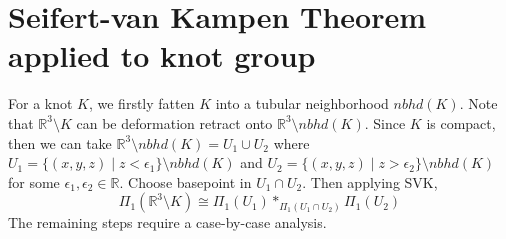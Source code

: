 \section{Seifert-van Kampen Theorem applied to knot group}

For a knot $K$, we firstly fatten $K$ into a tubular neighborhood $nbhd(K)$. Note that $\mathbb{R}^3 \setminus K$ can be deformation retract onto $\mathbb{R}^3 \setminus nbhd(K)$. Since $K$ is compact, then we can take $\mathbb{R}^3 \setminus nbhd(K) = U_1 \cup U_2$ where $U_1 = \{ (x,y,z) \mid z < \epsilon_1 \} \setminus nbhd(K)$ and $U_{2} = \{ (x,y,z) \mid z > \epsilon_2 \} \setminus nbhd(K)$ for some $\epsilon_1,\epsilon_2 \in \mathbb{R}$. Choose basepoint in $U_1 \cap U_2$. Then applying SVK,
$$\Pi_1(\mathbb{R}^3 \setminus K) \cong \Pi_1(U_1) *_{\Pi_1(U_1 \cap U_2)} \Pi_1(U_2)$$
The remaining steps require a case-by-case analysis.